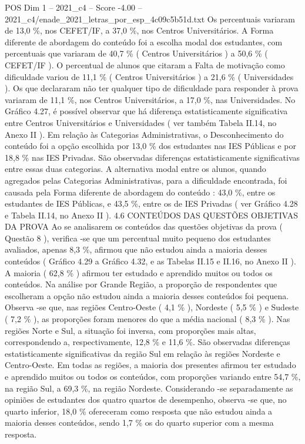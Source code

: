 \begin{textsample}{POS Dim 1 – 2021\_c4 – Score -4.00 – 2021\_c4/enade\_2021\_letras\_por\_esp\_4c09c5b51d.txt}
Os percentuais variaram de 13,0 \%, nos CEFET/IF, a 37,0 \%, nos Centros Universitários.
A Forma diferente de abordagem do conteúdo foi a escolha modal dos estudantes, com percentuais que variaram de 40,7 \% ( Centros Universitários ) a 50,6 \% ( CEFET/IF ).
O percentual de alunos que citaram a Falta de motivação como dificuldade variou de 11,1 \% ( Centros Universitários ) a 21,6 \% ( Universidades ).
Os que declararam não ter qualquer tipo de dificuldade para responder à prova variaram de 11,1 \%, nos Centros Universitários, a 17,0 \%, nas Universidades.
No Gráfico 4.27, é possível observar que há diferença estatisticamente significativa entre Centros Universitários e Universidades ( ver também Tabela II.14, no Anexo II ).
Em relação às Categorias Administrativas, o Desconhecimento do conteúdo foi a opção escolhida por 13,0 \% dos estudantes nas IES Públicas e por 18,8 \% nas IES Privadas.
São observadas diferenças estatisticamente significativas entre essas duas categorias.
A alternativa modal entre os alunos, quando agregados pelas Categorias Administrativas, para a dificuldade encontrada, foi causada pela Forma diferente de abordagem do conteúdo : 43,0 \%, entre os estudantes de IES Públicas, e 43,5 \%, entre os de IES Privadas ( ver Gráfico 4.28 e Tabela II.14, no Anexo II ). 4.6 CONTEÚDOS DAS QUESTÕES OBJETIVAS DA PROVA Ao se analisarem os conteúdos das questões objetivas da prova ( Questão 8 ), verifica -se que um percentual muito pequeno dos estudantes avaliados, apenas 8,3 \%, afirmou que não estudou ainda a maioria desses conteúdos ( Gráfico 4.29 a Gráfico 4.32, e as Tabelas II.15 e II.16, no Anexo II ).
A maioria ( 62,8 \% ) afirmou ter estudado e aprendido muitos ou todos os conteúdos.
Na análise por Grande Região, a proporção de respondentes que escolheram a opção não estudou ainda a maioria desses conteúdos foi pequena.
Observa -se que, nas regiões Centro-Oeste ( 4,1 \% ), Nordeste ( 5,5 \% ) e Sudeste ( 7,2 \% ), as proporções foram menores do que a média nacional ( 8,3 \% ).
Nas regiões Norte e Sul, a situação foi inversa, com proporções mais altas, correspondendo a, respectivamente, 12,8 \% e 11,6 \%.
São observadas diferenças estatisticamente significativas da região Sul em relação às regiões Nordeste e Centro-Oeste.
Em todas as regiões, a maioria dos presentes afirmou ter estudado e aprendido muitos ou todos os conteúdos, com proporções variando entre 54,7 \%, na região Sul, a 69,3 \%, na região Nordeste.
Considerando -se separadamente as opiniões de estudantes dos quatro quartos de desempenho, observa -se que, no quarto inferior, 18,0 \% ofereceram como resposta que não estudou ainda a maioria desses conteúdos, sendo 1,7 \% os do quarto superior com a mesma resposta.

\end{textsample}
